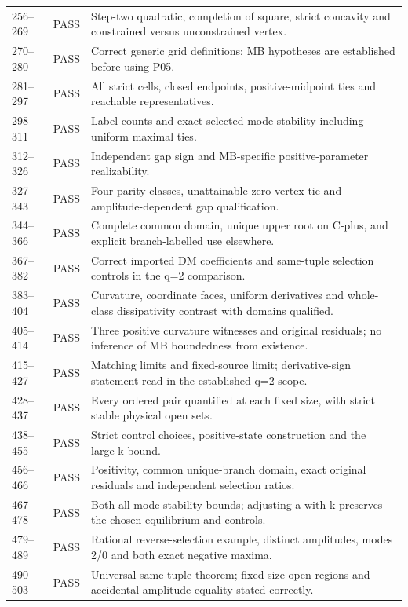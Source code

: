 \documentclass[11pt]{article}
\begin{document}
\begin{longtable}{@{}L{0.10\textwidth}L{0.17\textwidth}L{0.67\textwidth}@{}}
256--269 & PASS & Step-two quadratic, completion of square, strict concavity and constrained versus unconstrained vertex.\\
270--280 & PASS & Correct generic grid definitions; MB hypotheses are established before using P05.\\
281--297 & PASS & All strict cells, closed endpoints, positive-midpoint ties and reachable representatives.\\
298--311 & PASS & Label counts and exact selected-mode stability including uniform maximal ties.\\
312--326 & PASS & Independent gap sign and MB-specific positive-parameter realizability.\\
327--343 & PASS & Four parity classes, unattainable zero-vertex tie and amplitude-dependent gap qualification.\\
344--366 & PASS & Complete common domain, unique upper root on C-plus, and explicit branch-labelled use elsewhere.\\
367--382 & PASS & Correct imported DM coefficients and same-tuple selection controls in the q=2 comparison.\\
383--404 & PASS & Curvature, coordinate faces, uniform derivatives and whole-class dissipativity contrast with domains qualified.\\
405--414 & PASS & Three positive curvature witnesses and original residuals; no inference of MB boundedness from existence.\\
415--427 & PASS & Matching limits and fixed-source limit; derivative-sign statement read in the established q=2 scope.\\
428--437 & PASS & Every ordered pair quantified at each fixed size, with strict stable physical open sets.\\
438--455 & PASS & Strict control choices, positive-state construction and the large-k bound.\\
456--466 & PASS & Positivity, common unique-branch domain, exact original residuals and independent selection ratios.\\
467--478 & PASS & Both all-mode stability bounds; adjusting a with k preserves the chosen equilibrium and controls.\\
479--489 & PASS & Rational reverse-selection example, distinct amplitudes, modes 2/0 and both exact negative maxima.\\
490--503 & PASS & Universal same-tuple theorem; fixed-size open regions and accidental amplitude equality stated correctly.\\

\end{longtable}
\end{document}
